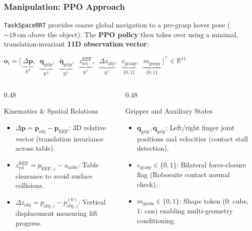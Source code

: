 \documentclass[10pt]{beamer}
\begin{document}
\begin{frame}
    \frametitle{Manipulation: PPO Approach}
    \small
    \texttt{TaskSpaceRRT} provides coarse global navigation to a pre-grasp hover pose ($\sim 18\,\text{cm}$ above the object). The \textbf{PPO policy} then takes over using a minimal, translation-invariant \textbf{11D observation vector}:
    
    \vspace{0.15cm}
    \centering
    $\mathbf{o}_t = \Big[\; \underbrace{\Delta\mathbf{p}}_{\mathbb{R}^3},\;\; \underbrace{\mathbf{q}_{\text{grip}}}_{\mathbb{R}^2},\;\; \underbrace{\dot{\mathbf{q}}_{\text{grip}}}_{\mathbb{R}^2},\;\; \underbrace{z_{\text{rel}}^{\text{EEF}}}_{\mathbb{R}^1},\;\; \underbrace{\Delta z_{\text{obj}}}_{\mathbb{R}^1},\;\; \underbrace{c_{\text{grasp}}}_{\{0,1\}},\;\; \underbrace{m_{\text{geom}}}_{\{0,1\}} \;\Big]^\top \in \mathbb{R}^{11}$
    \vspace{0.2cm}
    \begin{columns}[T]
        \begin{column}{0.48\textwidth}
            \begin{block}{Kinematics \& Spatial Relations}
                \begin{itemize}\footnotesize
                    \item $\Delta\mathbf{p} = \mathbf{p}_{\text{obj}} - \mathbf{p}_{\text{EEF}}$: 3D relative vector (translation invariance across table).
                    \item $z_{\text{rel}}^{\text{EEF}} = p_{\text{EEF}, z} - z_{\text{table}}$: Table clearance to avoid surface collisions.
                    \item $\Delta z_{\text{obj}} = p_{\text{obj}, z} - p_{\text{obj}, z}^{(0)}$: Vertical displacement measuring lift progress.
                \end{itemize}
            \end{block}
        \end{column}
        \begin{column}{0.48\textwidth}
            \begin{block}{Gripper and Auxiliary States}
                \begin{itemize}\footnotesize
                    \item $\mathbf{q}_{\text{grip}}, \dot{\mathbf{q}}_{\text{grip}}$: Left/right finger joint positions and velocities (contact stall detection).
                    \item $c_{\text{grasp}} \in \{0, 1\}$: Bilateral force-closure flag (Robosuite contact normal check).
                    \item $m_{\text{geom}} \in \{0, 1\}$: Shape token ($0$: cube, $1$: can) enabling multi-geometry conditioning.
                \end{itemize}
            \end{block}
        \end{column}
    \end{columns}
\end{frame}
\end{document}
